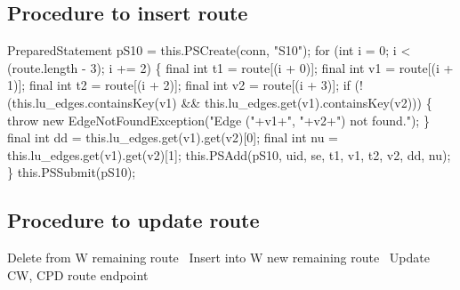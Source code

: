\subsection{Procedure to insert route}
\nwenddocs{}\endmoddef{}
PreparedStatement pS10 = this.PSCreate(conn, "S10");
for (int i = 0; i < (route.length - 3); i += 2) \{
  final int t1 = route[(i + 0)];
  final int v1 = route[(i + 1)];
  final int t2 = route[(i + 2)];
  final int v2 = route[(i + 3)];
  if (!(this.lu_edges.containsKey(v1) && this.lu_edges.get(v1).containsKey(v2))) \{
    throw new EdgeNotFoundException("Edge ("+v1+", "+v2+") not found.");
  \}
  final int dd = this.lu_edges.get(v1).get(v2)[0];
  final int nu = this.lu_edges.get(v1).get(v2)[1];
  this.PSAdd(pS10, uid, se, t1, v1, t2, v2, dd, nu);
\}
this.PSSubmit(pS10);
\nwendcode{}\nwdocspar

\subsection{Procedure to update route}
\nwenddocs{}\endmoddef{}
\LA{}Delete from W remaining route~{\nwtagstyle{}}\RA{}
\LA{}Insert into W new remaining route~{\nwtagstyle{}}\RA{}
\LA{}Update CW, CPD route endpoint~{\nwtagstyle{}}\RA{}
\nwendcode{}\nwdocspar


